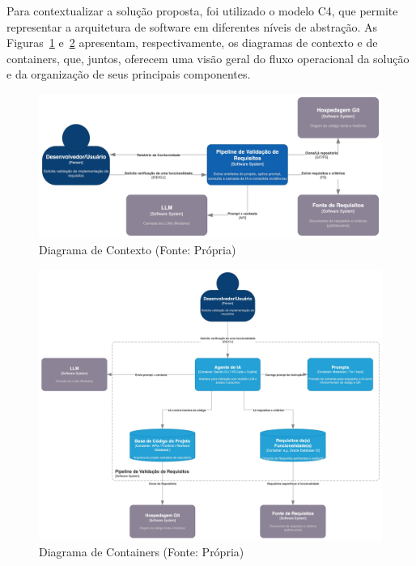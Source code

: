 Para contextualizar a solução proposta, foi utilizado o modelo C4, que permite representar a arquitetura de software em diferentes níveis de abstração. As Figuras~\ref{fig:c4_contexto} e~\ref{fig:c4_containers} apresentam, respectivamente, os diagramas de contexto e de containers, que, juntos, oferecem uma visão geral do fluxo operacional da solução e da organização de seus principais componentes.

\begin{figure}[H]
    \centering
    \begin{adjustbox}{width=0.9\textwidth,center}
        \includegraphics{imgs/c4_context.jpeg}
    \end{adjustbox}
    \caption{Diagrama de Contexto (Fonte: Própria)}
    \label{fig:c4_contexto}
\end{figure}

\begin{figure}[H]
    \centering
    \begin{adjustbox}{width=1.0\textwidth,center}
        \includegraphics{imgs/c4_container.jpeg}
    \end{adjustbox}
    \caption{Diagrama de Containers (Fonte: Própria)}
    \label{fig:c4_containers}
\end{figure}

